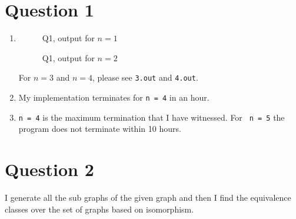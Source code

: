 \documentclass{article}
\begin{document}
\section*{Question 1}

\begin{enumerate}[label=\alph*), start=2]
\item
\begin{figure}[hp]
  
  \caption{Q1, output for $n = 1$ }
\end{figure}

\begin{figure}[hp]
  
  \caption{Q1, output for $n = 2$ }
\end{figure}

For $n =3$ and $n= 4$, please see \texttt{3.out} and \texttt{4.out}.
\item  My implementation terminates for \texttt{n = 4} in an hour.
\item \texttt{n = 4} is the maximum termination that I have
  witnessed. For \texttt{ n = 5} the program does not terminate within
  10 hours. 
\end{enumerate}

\section*{Question 2}
I generate all the sub graphs of the given graph and then I find the
equivalence classes over the set of graphs based on isomorphism.
\end{document}

